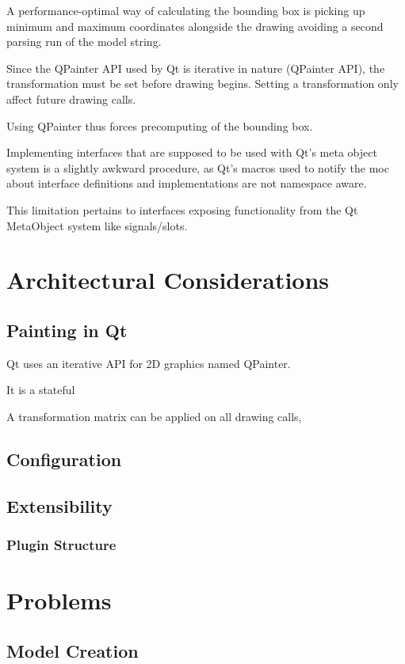 A performance-optimal way of calculating the bounding box is picking up minimum and maximum coordinates alongside the drawing avoiding a second parsing run of the model string.

Since the \term QPainter API used by Qt is iterative in nature (\term QPainter API), the transformation must be set before drawing begins. Setting a transformation only affect future drawing calls.

Using \term QPainter thus forces precomputing of the bounding box.


Implementing interfaces that are supposed to be used with Qt's meta object system is a slightly awkward procedure, as Qt's macros used to notify the moc about interface definitions and implementations are not namespace aware. 

This limitation pertains to interfaces exposing functionality from the Qt MetaObject system like signals/slots.

\section{Architectural Considerations}

\subsection{Painting in Qt}
Qt uses an iterative API for 2D graphics named QPainter.

It is a stateful 

A transformation matrix can be applied on all drawing calls,

\subsection{Configuration}



\subsection{Extensibility}
\subsubsection{Plugin Structure}

\section{Problems}
\subsection{Model Creation}
